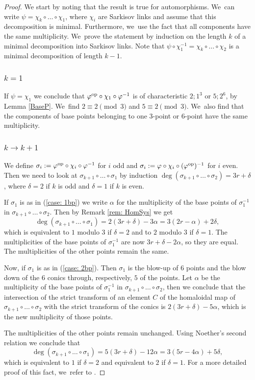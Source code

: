 \documentclass[JEP,XML,SOM,Unicode,NoFloatCountersInSection, NoEqCountersInSection,published]{cedram}
\newcommand{\op}{\textup{op}}
\theoremstyle{definition}
\begin{document}
\begin{proof}
We start by noting that the result is true for automorphisms. We~can write $\psi = \chi_k \circ \dots \circ \chi_1$, where $\chi_i$ are Sarkisov links and assume that this decomposition is minimal. Furthermore, we~use the fact that all components have the same multiplicity. We~prove the statement by induction on the length $k$ of a minimal decomposition into Sarkisov links. Note that $\psi \circ \chi_1^{-1} = \chi_k \circ \dots \circ \chi_2$ is a minimal decomposition of length $k-1$.

\subsubsection*{$k=1$}
If $\psi = \chi_1$ we conclude that $\varphi^{\op} \circ \chi_1 \circ \varphi^{-1}$ is of characteristic $2;1^3$ or $5;2^6$, by Lemma \ref{BaseP}. We~find $2 \equiv 2 \pmod 3$ and $5 \equiv 2 \pmod 3$. We~also find that the components of base points belonging to one $3$\nobreakdash-point or $6$\nobreakdash-point have the same multiplicity.

\subsubsection*{$k \to k+1$}
We define $\sigma_i := \varphi^{\op} \circ \chi_i \circ \varphi^{-1}$ for $i$ odd and $\sigma_i := \varphi \circ\chi_i \circ (\varphi^{\op})^{-1}$ for $i$ even. Then we need to look at $\sigma_{k+1} \circ \dots \circ \sigma_1$ by induction $\deg(\sigma_{k+1} \circ \dots \circ \sigma_2) = 3r + \delta$, where $\delta = 2$ if $k$ is odd and $\delta = 1$ if $k$ is even.

If $\sigma_1$ is as in (\ref{case: 1bp}) we write $\alpha$ for the multiplicity of the base points of $\sigma_1^{-1}$ in $\sigma_{k+1} \circ \dots \circ \sigma_2$. Then by Remark \ref{rem: HomSys} we get
\[
\deg(\sigma_{k+1} \circ \dots \circ \sigma_1) = 2(3r + \delta) - 3\alpha = 3(2r - \alpha) + 2 \delta,
\]
which is equivalent to $1$ modulo $3$ if $\delta = 2$ and to $2$ modulo $3$ if $\delta = 1$. The multiplicities of the base points of $\sigma_1^{-1}$ are now $3r + \delta - 2 \alpha$, so they are equal. The multiplicities of the other points remain the same.

Now, if $\sigma_1$ is as in (\ref{case: 2bp}). Then $\sigma_1$ is the blow-up of $6$ points and the blow down of the $6$ conics through, respectively, $5$ of the points. Let $\alpha$ be the multiplicity of the base points of $\sigma_1^{-1}$ in $\sigma_{k+1} \circ \dots \circ \sigma_2$, then we conclude that the intersection of the strict transform of an element $C$ of the homaloidal map of $\sigma_{k+1} \circ \dots \circ \sigma_2$ with the strict transform of the conics is $2(3r + \delta) - 5\alpha$, which is the new multiplicity of those points.

The multiplicities of the other points remain unchanged. Using Noether's second relation we conclude that
\[
\deg(\sigma_{k+1} \circ \dots \circ \sigma_1) = 5(3r + \delta) - 12 \alpha = 3(5r - 4 \alpha) + 5\delta,
\]
which is equivalent to $1$ if $\delta = 2$ and equivalent to $2$ if $\delta = 1$. For a more detailed proof of this fact, we~refer to \cite[\S 4]{zbMATH01683518}.
\end{proof}
\end{document}
